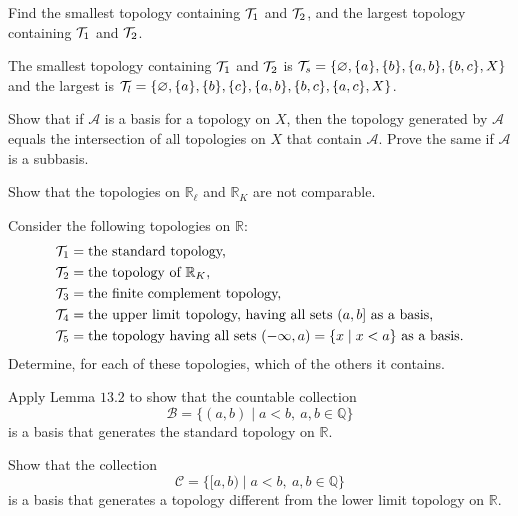 \begin{exercise}
\begin{exercise}[label = (\alph*)]
\[    \]
    Find the smallest topology containing \(\mathcal{T}_1\) and \(\mathcal{T}_2\), and the
    largest topology containing \(\mathcal{T}_1\) and \(\mathcal{T}_2\).
    \par\smallskip
    The smallest topology containing \(\mathcal{T}_1\) and \(\mathcal{T}_2\) is
    \(\mathcal{T}_s = \{\varnothing,\{a\},\{b\},\{a,b\},\{b,c\},X\}\) and the largest
    is
    \(\mathcal{T}_l = \{\varnothing,\{a\},\{b\},\{c\},\{a,b\},\{b,c\},\{a,c\},X\}\).
  \end{exercise}
\item
  Show that if \(\mathcal{A}\) is a basis for a topology on \(X\), then the
  topology generated by \(\mathcal{A}\) equals the intersection of all
  topologies on \(X\) that contain \(\mathcal{A}\).
  Prove the same if \(\mathcal{A}\) is a subbasis.
\item
  Show that the topologies on \(\mathbb{R}_{\ell}\) and \(\mathbb{R}_K\) are
  not comparable.
\item
  Consider the following topologies on \(\mathbb{R}\):
  \begin{align*}
    \mathcal{T}_1 & = \text{the standard topology,}\\
    \mathcal{T}_2 & = \text{the topology of } \mathbb{R}_K,\\
    \mathcal{T}_3 & = \text{the finite complement topology,}\\
    \mathcal{T}_4 & = \text{the upper limit topology, having all sets } (a, b]
             \text{ as a basis,}\\
    \mathcal{T}_5 & = \text{the topology having all sets }
             (-\infty, a) = \{x\mid x < a\} \text{ as a basis.}
  \end{align*}
  Determine, for each of these topologies, which of the others it contains.
\item
  \begin{exercise}[label = (\alph*)]
  \item
    Apply Lemma \(13.2\) to show that the countable collection
    \[
    \mathcal{B} = \{(a, b)\mid a < b, \ a,b\in\mathbb{Q}\}
    \]
    is a basis that generates the standard topology on \(\mathbb{R}\).
  \item
    Show that the collection
    \[
    \mathcal{C} = \{[a, b)\mid a < b, \ a,b\in\mathbb{Q}\}
    \]
    is a basis that generates a topology different from the lower limit
    topology on \(\mathbb{R}\).
  \end{exercise}
\end{exercise}

